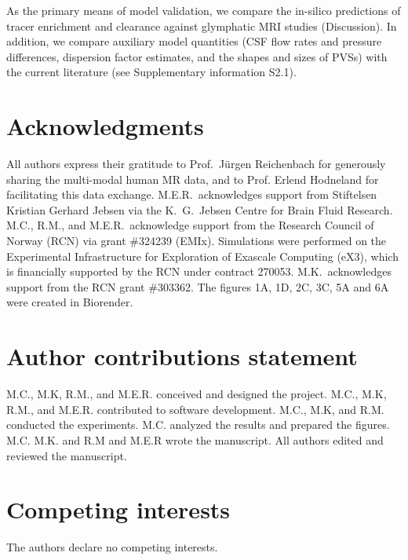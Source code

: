 \documentclass[fleqn,10pt]{wlscirep}
\begin{document}
As the primary means of model validation, we compare the in-silico
predictions of tracer enrichment and clearance against glymphatic MRI
studies (Discussion). In addition, we compare auxiliary model
quantities (CSF flow rates and pressure differences, dispersion factor
estimates, and the shapes and sizes of PVSs) with the current
literature (see Supplementary information S2.1).

\section*{Acknowledgments}

All authors express their gratitude to Prof.~Jürgen Reichenbach for
generously sharing the multi-modal human MR data, and to Prof. Erlend
Hodneland for facilitating this data exchange. M.E.R.~acknowledges
support from Stiftelsen Kristian Gerhard Jebsen via the K.~G.~Jebsen
Centre for Brain Fluid Research. M.C., R.M., and M.E.R.~acknowledge
support from the Research Council of Norway (RCN) via grant \#324239
(EMIx). Simulations were performed on the Experimental Infrastructure
for Exploration of Exascale Computing (eX3), which is financially
supported by the RCN under contract 270053. M.K.~acknowledges support
from the RCN grant \#303362. The figures 1A, 1D, 2C, 3C, 5A and 6A
were created in Biorender.

\section*{Author contributions statement}

M.C., M.K, R.M., and M.E.R. conceived and designed the project.
M.C., M.K, R.M., and M.E.R. contributed to software development. 
M.C., M.K, and R.M. conducted the experiments.
M.C. analyzed the results and prepared the figures.
M.C. M.K. and R.M and M.E.R wrote the manuscript. 
All authors edited and reviewed the manuscript.

\section*{Competing interests}

The authors declare no competing interests.



\end{document}
